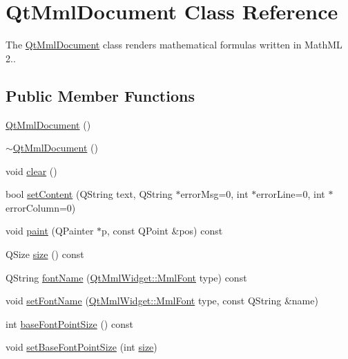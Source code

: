 \hypertarget{class_qt_mml_document}{}\section{Qt\+Mml\+Document Class Reference}
\label{class_qt_mml_document}


The \mbox{\hyperlink{class_qt_mml_document}{Qt\+Mml\+Document}} class renders mathematical formulas written in Math\+ML 2..  


\subsection*{Public Member Functions}
\begin{DoxyCompactItemize}
\item 
\mbox{\hyperlink{class_qt_mml_document_a38d53f9b6b073434a4e0ee458b9d8eca}{Qt\+Mml\+Document}} ()
\item 
\mbox{\hyperlink{class_qt_mml_document_a09f03d96a88be2e42a7a14c633a75e94}{$\sim$\+Qt\+Mml\+Document}} ()
\item 
void \mbox{\hyperlink{class_qt_mml_document_add5a21595194288f647e020f36448587}{clear}} ()
\item 
bool \mbox{\hyperlink{class_qt_mml_document_a08e287efbea760c51f22fec4a4c5067e}{set\+Content}} (Q\+String text, Q\+String $\ast$error\+Msg=0, int $\ast$error\+Line=0, int $\ast$error\+Column=0)
\item 
void \mbox{\hyperlink{class_qt_mml_document_a76b9c85044e6715ff778efd607cc1309}{paint}} (Q\+Painter $\ast$p, const Q\+Point \&pos) const
\item 
Q\+Size \mbox{\hyperlink{class_qt_mml_document_a01cd1b6f95f011fa3a9a9292e833528e}{size}} () const
\item 
Q\+String \mbox{\hyperlink{class_qt_mml_document_aee262410ce903f2a58c1eac22311266a}{font\+Name}} (\mbox{\hyperlink{class_qt_mml_widget_ac3fde39f7b605557d80bded69f985d2a}{Qt\+Mml\+Widget\+::\+Mml\+Font}} type) const
\item 
void \mbox{\hyperlink{class_qt_mml_document_a6e722bc5c964444616ef4d9e640d9350}{set\+Font\+Name}} (\mbox{\hyperlink{class_qt_mml_widget_ac3fde39f7b605557d80bded69f985d2a}{Qt\+Mml\+Widget\+::\+Mml\+Font}} type, const Q\+String \&name)
\item 
int \mbox{\hyperlink{class_qt_mml_document_a6988266de54f91cdc03e3d20915828c1}{base\+Font\+Point\+Size}} () const
\item 
void \mbox{\hyperlink{class_qt_mml_document_aedb2bedfbc96f3fb41cd04ecf3f327f2}{set\+Base\+Font\+Point\+Size}} (int \mbox{\hyperlink{class_qt_mml_document_a01cd1b6f95f011fa3a9a9292e833528e}{size}})
\end{DoxyCompactItemize}


